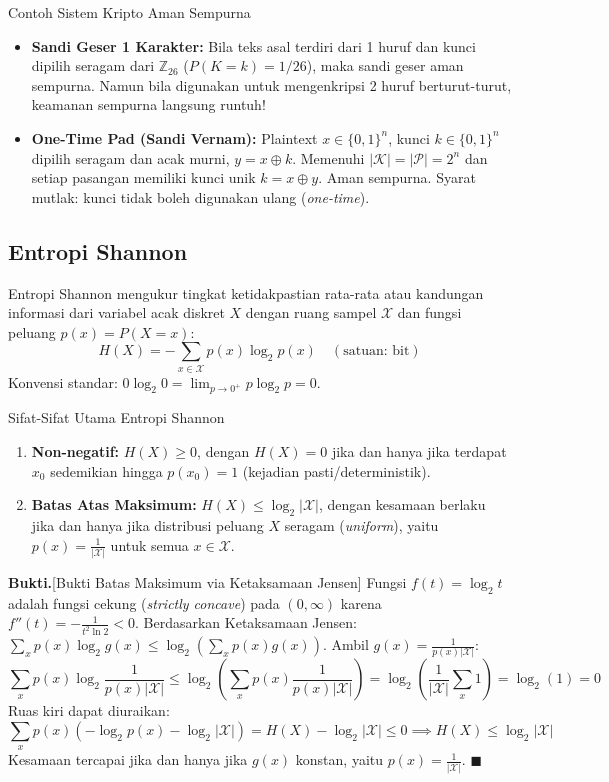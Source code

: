 \documentclass[11pt,a4paper]{article}
\newenvironment{proof}{\noindent\textbf{Bukti.}}{\hfill$\blacksquare$\vspace{0.3em}}
\begin{document}
\begin{rumusbox}{Contoh Sistem Kripto Aman Sempurna}
\begin{itemize}[leftmargin=*]
    \item \textbf{Sandi Geser 1 Karakter:} Bila teks asal terdiri dari 1 huruf dan kunci dipilih seragam dari $\mathbb{Z}_{26}$ ($P(K = k) = 1/26$), maka sandi geser aman sempurna. Namun bila digunakan untuk mengenkripsi 2 huruf berturut-turut, keamanan sempurna langsung runtuh!
    \item \textbf{One-Time Pad (Sandi Vernam):} Plaintext $x \in \{0, 1\}^n$, kunci $k \in \{0, 1\}^n$ dipilih seragam dan acak murni, $y = x \oplus k$. Memenuhi $|\mathcal{K}| = |\mathcal{P}| = 2^n$ dan setiap pasangan memiliki kunci unik $k = x \oplus y$. Aman sempurna. Syarat mutlak: kunci tidak boleh digunakan ulang (\textit{one-time}).
\end{itemize}
\end{rumusbox}

\subsection{Entropi Shannon}
Entropi Shannon mengukur tingkat ketidakpastian rata-rata atau kandungan informasi dari variabel acak diskret $X$ dengan ruang sampel $\mathcal{X}$ dan fungsi peluang $p(x) = P(X = x)$:
\[
H(X) = -\sum_{x \in \mathcal{X}} p(x) \log_2 p(x) \quad (\text{satuan: bit})
\]
Konvensi standar: $0 \log_2 0 = \lim_{p \to 0^+} p \log_2 p = 0$.

\begin{thmbox}{Sifat-Sifat Utama Entropi Shannon}
\begin{enumerate}[leftmargin=*]
    \item \textbf{Non-negatif:} $H(X) \ge 0$, dengan $H(X) = 0$ jika dan hanya jika terdapat $x_0$ sedemikian hingga $p(x_0) = 1$ (kejadian pasti/deterministik).
    \item \textbf{Batas Atas Maksimum:} $H(X) \le \log_2 |\mathcal{X}|$, dengan kesamaan berlaku jika dan hanya jika distribusi peluang $X$ seragam (\textit{uniform}), yaitu $p(x) = \frac{1}{|\mathcal{X}|}$ untuk semua $x \in \mathcal{X}$.
\end{enumerate}
\begin{proof}[Bukti Batas Maksimum via Ketaksamaan Jensen]
Fungsi $f(t) = \log_2 t$ adalah fungsi cekung (\textit{strictly concave}) pada $(0, \infty)$ karena $f''(t) = -\frac{1}{t^2 \ln 2} < 0$. Berdasarkan Ketaksamaan Jensen: $\sum_x p(x) \log_2 g(x) \le \log_2 \left(\sum_x p(x) g(x)\right)$. Ambil $g(x) = \frac{1}{p(x)|\mathcal{X}|}$:
\[
\sum_{x} p(x) \log_2 \frac{1}{p(x)|\mathcal{X}|} \le \log_2 \left(\sum_{x} p(x) \frac{1}{p(x)|\mathcal{X}|}\right) = \log_2 \left(\frac{1}{|\mathcal{X}|} \sum_{x} 1\right) = \log_2(1) = 0
\]
Ruas kiri dapat diuraikan:
\[
\sum_x p(x) \left(-\log_2 p(x) - \log_2 |\mathcal{X}|\right) = H(X) - \log_2 |\mathcal{X}| \le 0 \implies H(X) \le \log_2 |\mathcal{X}|
\]
Kesamaan tercapai jika dan hanya jika $g(x)$ konstan, yaitu $p(x) = \frac{1}{|\mathcal{X}|}$.
\end{proof}
\end{thmbox}
\end{document}
